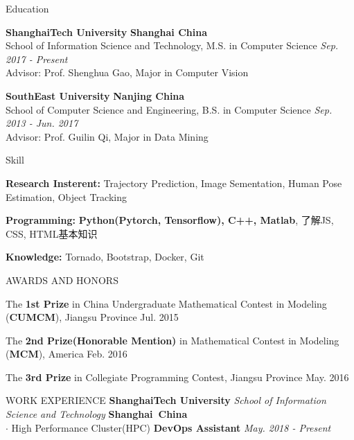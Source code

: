 \documentclass{resume} %
\begin{document}

\begin{rSection}{Education}

{\bf ShanghaiTech University} \hfill {\bf Shanghai China}
\\ 
School of Information Science and Technology, M.S. in Computer Science \hfill {\em Sep. 2017 - Present}
\\
Advisor: Prof. Shenghua Gao, Major in  Computer Vision

{\bf SouthEast University} \hfill {\bf Nanjing China}
\\ 
School of Computer Science and Engineering, B.S. in Computer Science \hfill {\em Sep. 2013 - Jun. 2017}
\\
Advisor: Prof. Guilin Qi, Major in Data Mining
\end{rSection}


\begin{rSection}{Skill} \itemsep -5pt {} 
    \item \textbf{Research Insterent:} Trajectory Prediction, Image Sementation, Human Pose Estimation, Object Tracking
    \item \textbf{Programming:} \textbf{Python(Pytorch, Tensorflow), C++, Matlab}, 了解JS, CSS, HTML基本知识
    \item \textbf{Knowledge:} Tornado, Bootstrap, Docker, Git
\end{rSection}
    
\begin{rSection}{AWARDS AND HONORS}  \itemsep -5pt {} 
    \item The {\bf 1st Prize} in China Undergraduate Mathematical Contest in Modeling (\textbf{CUMCM}), Jiangsu Province \hfill Jul. 2015
    \item The {\bf 2nd Prize(Honorable Mention)} in Mathematical Contest in Modeling (\textbf{MCM}), America \hfill Feb. 2016
    \item The {\bf 3rd Prize} in Collegiate Programming Contest, Jiangsu Province \hfill May. 2016
\end{rSection} 
    
    
\begin{rSection}{WORK EXPERIENCE}
    {\bf ShanghaiTech University} {\em School of Information Science and Technology}  \hfill {\bf Shanghai\ China} \\
    $\cdot$ High Performance Cluster(HPC) {\bf DevOps Assistant} \hfill {\em May. 2018 - Present}

\end{rSection} 
\end{document}
